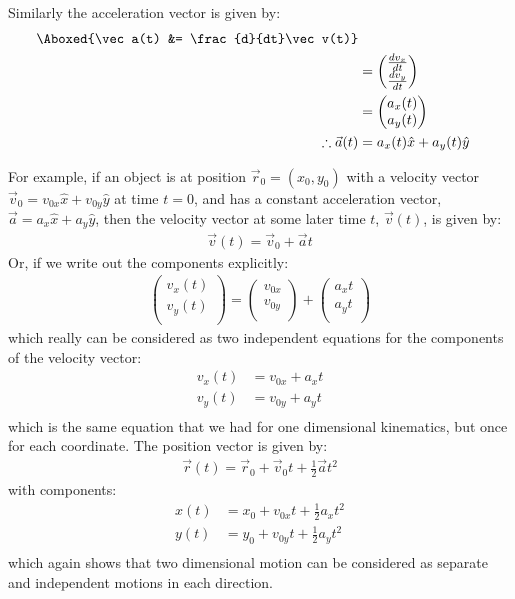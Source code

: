Similarly the acceleration vector is given by:
\begin{align}
\label{eqn:describingmotioninnd:avecdef}
\Aboxed{\vec a(t) &= \frac{d}{dt}\vec v(t)} \\
&=\begin{pmatrix}
           \frac{dv_x}{dt}  \\
          \frac{dv_y}{dt}  \\
         \end{pmatrix}\nonumber\\
&=\begin{pmatrix}
           a_x(t) \\
           a_y(t) \\
         \end{pmatrix}\nonumber\\
\therefore \vec a(t) &= a_x(t)\hat x+a_y(t)\hat y      \nonumber        
\end{align}

For example, if an object is at position $\vec r_0=(x_0,y_0)$ with a velocity vector $\vec v_0=v_{0x}\hat x + v_{0y}\hat y$ at time $t=0$, and has a constant acceleration vector, $\vec a = a_x\hat x+a_y\hat y$, then the velocity vector at some later time $t$, $\vec v(t)$, is given by:
\begin{align*}
\vec v(t) = \vec v_0 + \vec a t
\end{align*}
Or, if we write out the components explicitly:
\begin{align*}
\begin{pmatrix}
           v_x(t) \\
           v_y(t) \\
         \end{pmatrix} = \begin{pmatrix}
           v_{0x} \\
           v_{0y} \\
         \end{pmatrix} + \begin{pmatrix}
           a_xt \\
           a_yt \\
         \end{pmatrix}
\end{align*}
which really can be considered as two independent equations for the components of the velocity vector:
\begin{align*}
v_x(t)&=v_{0x}+a_xt \\
v_y(t)&=v_{0y}+a_yt \\
\end{align*}
which is the same equation that we had for one dimensional kinematics, but once for each coordinate. The position vector is given by:
\begin{align*}
\vec r(t) = \vec r_0 + \vec v_0 t + \frac{1}{2} \vec at^2
\end{align*}
with components:
\begin{align*}
x(t) &= x_0+v_{0x}t+\frac{1}{2}a_xt^2\\
y(t) &= y_0+v_{0y}t+\frac{1}{2}a_yt^2\\
\end{align*}
which again shows that two dimensional motion can be considered as separate and independent motions in each direction.

